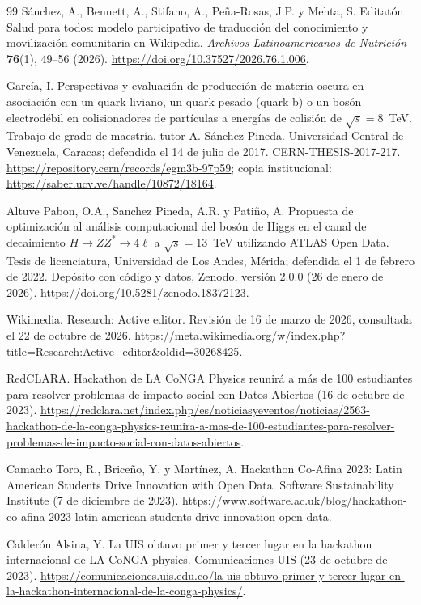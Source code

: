 \begin{thebibliography}{99}
 Sánchez, A., Bennett, A., Stifano, A., Peña-Rosas, J.P. y Mehta, S. Editatón Salud para todos: modelo participativo de traducción del conocimiento y movilización comunitaria en Wikipedia. \emph{Archivos Latinoamericanos de Nutrición} \textbf{76}(1), 49--56 (2026). \url{https://doi.org/10.37527/2026.76.1.006}.

 García, I. Perspectivas y evaluación de producción de materia oscura en asociación con un quark liviano, un quark pesado (quark b) o un bosón electrodébil en colisionadores de partículas a energías de colisión de $\sqrt{s}=8$~TeV. Trabajo de grado de maestría, tutor A. Sánchez Pineda. Universidad Central de Venezuela, Caracas; defendida el 14 de julio de 2017. CERN-THESIS-2017-217. \url{https://repository.cern/records/egm3b-97p59}; copia institucional: \url{https://saber.ucv.ve/handle/10872/18164}.

 Altuve Pabon, O.A., Sanchez Pineda, A.R. y Patiño, A. Propuesta de optimización al análisis computacional del bosón de Higgs en el canal de decaimiento $H\to ZZ^{*}\to 4\ell$ a $\sqrt{s}=13$~TeV utilizando ATLAS Open Data. Tesis de licenciatura, Universidad de Los Andes, Mérida; defendida el 1 de febrero de 2022. Depósito con código y datos, Zenodo, versión 2.0.0 (26 de enero de 2026). \url{https://doi.org/10.5281/zenodo.18372123}.

 Wikimedia. Research: Active editor. Revisión de 16 de marzo de 2026, consultada el 22 de octubre de 2026. \url{https://meta.wikimedia.org/w/index.php?title=Research:Active_editor&oldid=30268425}.

 RedCLARA. Hackathon de LA CoNGA Physics reunirá a más de 100 estudiantes para resolver problemas de impacto social con Datos Abiertos (16 de octubre de 2023). \url{https://redclara.net/index.php/es/noticiasyeventos/noticias/2563-hackathon-de-la-conga-physics-reunira-a-mas-de-100-estudiantes-para-resolver-problemas-de-impacto-social-con-datos-abiertos}.

 Camacho Toro, R., Briceño, Y. y Martínez, A. Hackathon Co-Afina 2023: Latin American Students Drive Innovation with Open Data. Software Sustainability Institute (7 de diciembre de 2023). \url{https://www.software.ac.uk/blog/hackathon-co-afina-2023-latin-american-students-drive-innovation-open-data}.

 Calderón Alsina, Y. La UIS obtuvo primer y tercer lugar en la hackathon internacional de LA-CoNGA physics. Comunicaciones UIS (23 de octubre de 2023). \url{https://comunicaciones.uis.edu.co/la-uis-obtuvo-primer-y-tercer-lugar-en-la-hackathon-internacional-de-la-conga-physics/}.


\end{thebibliography}
